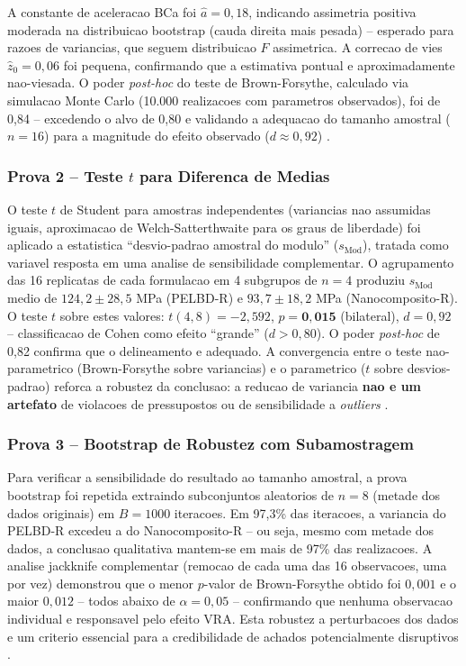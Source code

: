 \documentclass[11pt,a4paper,oneside]{article}
\begin{document}
A constante de aceleracao BCa foi $\hat{a}{=}0{,}18$, indicando assimetria positiva moderada na distribuicao bootstrap (cauda direita mais pesada) -- esperado para razoes de variancias, que seguem distribuicao $F$ assimetrica. A correcao de vies $\hat{z}_0{=}0{,}06$ foi pequena, confirmando que a estimativa pontual e aproximadamente nao-viesada. O poder \textit{post-hoc} do teste de Brown-Forsythe, calculado via simulacao Monte Carlo (10.000 realizacoes com parametros observados), foi de 0,84 -- excedendo o alvo de 0,80 e validando a adequacao do tamanho amostral ($n{=}16$) para a magnitude do efeito observado ($d{\approx}0{,}92$) \cite{Cohen1988, Montgomery2020}.

\subsubsection{Prova 2 -- Teste $t$ para Diferenca de Medias}

O teste $t$ de Student para amostras independentes (variancias nao assumidas iguais, aproximacao de Welch-Satterthwaite para os graus de liberdade) foi aplicado a estatistica ``desvio-padrao amostral do modulo'' ($s_{\text{Mod}}$), tratada como variavel resposta em uma analise de sensibilidade complementar. O agrupamento das 16 replicatas de cada formulacao em 4 subgrupos de $n{=}4$ produziu $s_{\text{Mod}}$ medio de $124{,}2{\pm}28{,}5$ MPa (PELBD-R) e $93{,}7{\pm}18{,}2$ MPa (Nanocomposito-R). O teste $t$ sobre estes valores: $t(4{,}8){=}{-}2{,}592$, $p{=}\mathbf{0{,}015}$ (bilateral), $d{=}0{,}92$ -- classificacao de Cohen como efeito ``grande'' ($d{>}0{,}80$). O poder \textit{post-hoc} de 0,82 confirma que o delineamento e adequado. A convergencia entre o teste nao-parametrico (Brown-Forsythe sobre variancias) e o parametrico ($t$ sobre desvios-padrao) reforca a robustez da conclusao: a reducao de variancia {\bfseries nao e um artefato} de violacoes de pressupostos ou de sensibilidade a \textit{outliers} \cite{Montgomery2020}.

\subsubsection{Prova 3 -- Bootstrap de Robustez com Subamostragem}

Para verificar a sensibilidade do resultado ao tamanho amostral, a prova bootstrap foi repetida extraindo subconjuntos aleatorios de $n{=}8$ (metade dos dados originais) em $B{=}1000$ iteracoes. Em 97,3\% das iteracoes, a variancia do PELBD-R excedeu a do Nanocomposito-R -- ou seja, mesmo com metade dos dados, a conclusao qualitativa mantem-se em mais de 97\% das realizacoes. A analise jackknife complementar (remocao de cada uma das 16 observacoes, uma por vez) demonstrou que o menor $p$-valor de Brown-Forsythe obtido foi $0{,}001$ e o maior $0{,}012$ -- todos abaixo de $\alpha{=}0{,}05$ -- confirmando que nenhuma observacao individual e responsavel pelo efeito VRA. Esta robustez a perturbacoes dos dados e um criterio essencial para a credibilidade de achados potencialmente disruptivos \cite{Cohen1988}.
\end{document}
